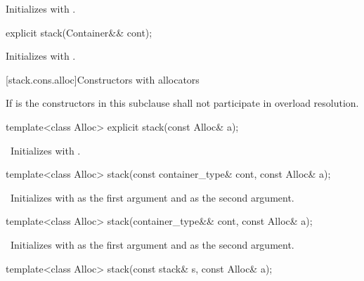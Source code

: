 \begin{itemdescr}
\pnum
\effects Initializes  with .
\end{itemdescr}

%
\begin{itemdecl}
explicit stack(Container&& cont);
\end{itemdecl}

\begin{itemdescr}
\pnum
\effects Initializes  with .
\end{itemdescr}

[stack.cons.alloc]{Constructors with allocators}

\pnum
If  is 
the constructors in this subclause shall not participate in overload resolution.

%
\begin{itemdecl}
template<class Alloc> explicit stack(const Alloc& a);
\end{itemdecl}

\begin{itemdescr}
\pnum
\effects\ Initializes  with .
\end{itemdescr}

%
\begin{itemdecl}
template<class Alloc> stack(const container_type& cont, const Alloc& a);
\end{itemdecl}

\begin{itemdescr}
\pnum
\effects\ Initializes  with  as the first argument and  as the
second argument.
\end{itemdescr}

%
\begin{itemdecl}
template<class Alloc> stack(container_type&& cont, const Alloc& a);
\end{itemdecl}

\begin{itemdescr}
\pnum
\effects\ Initializes  with  as the first argument and 
as the second argument.
\end{itemdescr}

%
\begin{itemdecl}
template<class Alloc> stack(const stack& s, const Alloc& a);
\end{itemdecl}


